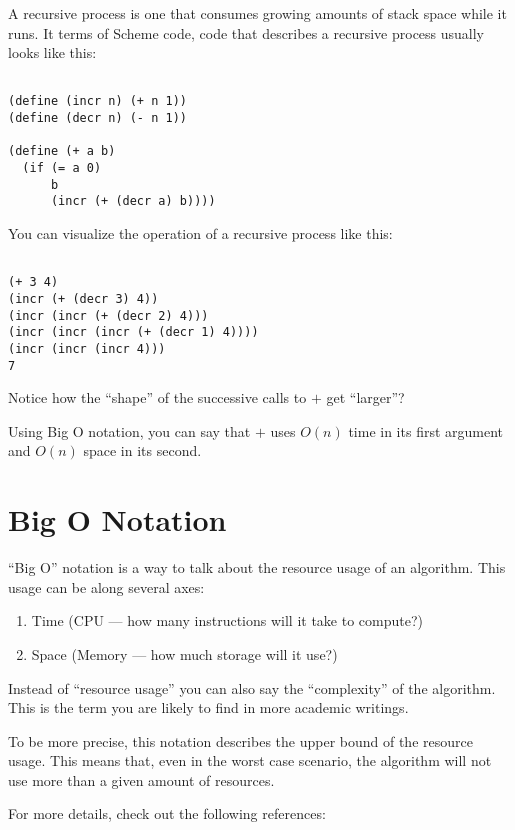 \documentclass[12pt,openright,draft]{book}
\begin{document}
A recursive process is one that consumes growing amounts of stack
space while it runs.  It terms of Scheme code, code that describes a
recursive process usually looks like this:

\begin{verbatim}

(define (incr n) (+ n 1))
(define (decr n) (- n 1))

(define (+ a b)
  (if (= a 0)
      b
      (incr (+ (decr a) b))))

\end{verbatim}

You can visualize the operation of a recursive process like this:

\begin{verbatim}

(+ 3 4)
(incr (+ (decr 3) 4))
(incr (incr (+ (decr 2) 4)))
(incr (incr (incr (+ (decr 1) 4))))
(incr (incr (incr 4)))
7

\end{verbatim}

Notice how the ``shape'' of the successive calls to $+$ get
``larger''?

Using Big O notation, you can say that $+$ uses $O(n)$ time in its
first argument and $O(n)$ space in its second.

\section{Big O Notation}

``Big O'' notation is a way to talk about the resource usage of an
algorithm.  This usage can be along several axes:

\begin{enumerate}
\item Time (CPU --- how many instructions will it take to compute?)
\item Space (Memory --- how much storage will it use?)
\end{enumerate}

Instead of ``resource usage'' you can also say the ``complexity'' of
the algorithm.  This is the term you are likely to find in more
academic writings.

To be more precise, this notation describes the upper bound of the
resource usage.  This means that, even in the worst case scenario, the
algorithm will not use more than a given amount of resources.

For more details, check out the following references:
\end{document}
